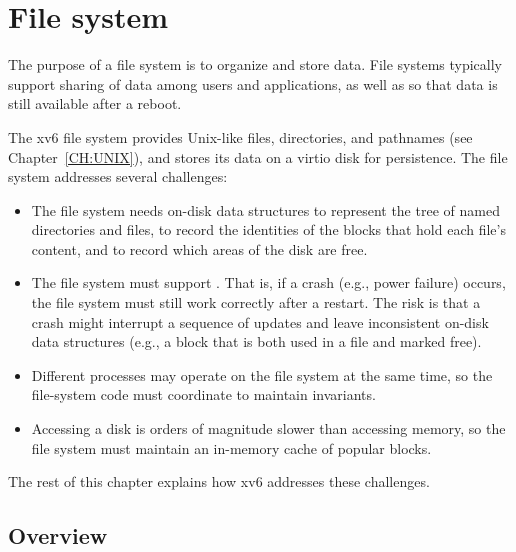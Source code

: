 \chapter{File system}
\label{CH:FS}
% 
% 
% 	
% 

The purpose of a file system is to organize and store data. File systems
typically support sharing of data among users and applications, as well as
so that data is still available after a reboot.

The xv6 file system provides Unix-like files, directories, and pathnames
(see Chapter~\ref{CH:UNIX}), and stores its data on a virtio disk for
persistence. The file system addresses
several challenges:
\begin{itemize}
  
\item The file system needs on-disk data structures to represent the tree
of named directories and files, to record the identities of the
blocks that hold each file's content, and to record which areas
of the disk are free.
\item The file system must support
.
That is, if a crash (e.g., power failure) occurs, the file system must
still work correctly after a restart. The risk is that a crash might
interrupt a sequence of updates and leave inconsistent on-disk data
structures (e.g., a block that is both used in a file and marked free).
\item Different processes may operate on the file system at the same time,
so the file-system code must coordinate to maintain invariants.
\item Accessing a disk is orders of magnitude slower than accessing
memory, so the file system must maintain an in-memory cache of
popular blocks.

\end{itemize}

The rest of this chapter explains how xv6 addresses these challenges.
\section{Overview}

